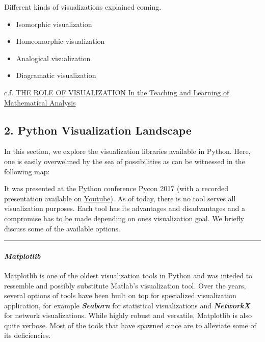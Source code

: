 \documentclass[11pt]{article}
\providecommand{\tightlist}{%
      \setlength{\itemsep}{0pt}\setlength{\parskip}{0pt}}
\begin{document}
    Different kinds of visualizations explained coming.

\begin{itemize}
\tightlist
\item
  Isomorphic visualization
\item
  Homeomorphic visualization
\item
  Analogical visualization
\item
  Diagramatic visualization
\end{itemize}

c.f. \href{http://users.math.uoc.gr/~ictm2/Proceedings/invGuz.pdf}{THE
ROLE OF VISUALIZATION In the Teaching and Learning of Mathematical
Analysis}

    \subsection{2. Python Visualization Landscape
}\label{python-visualization-landscape}

In this section, we explore the visualization libraries available in
Python. Here, one is easily overwelmed by the sea of possibilities as
can be witnessed in the following map:

    

    It was presented at the Python conference Pycon 2017 (with a recorded
presentation available on
\href{https://www.youtube.com/watch?v=TPl9bMg8j8U}{Youtube}). As of
today, there is no tool serves all visualization purposes. Each tool has
its advantages and disadvantages and a compromise has to be made
depending on ones visualization goal. We briefly discuss some of the
available options.

\begin{center}\rule{0.5\linewidth}{\linethickness}\end{center}

\paragraph{\texorpdfstring{\emph{Matplotlib}}{Matplotlib}}\label{matplotlib}

Matplotlib is one of the oldest visualization tools in Python and was
inteded to ressemble and possibly substitute Matlab's visualization
tool. Over the years, several options of tools have been built on top
for specialized visualization application, for example
\textbf{\emph{Seaborn}} for statistical visualizations and
\textbf{\emph{NetworkX}} for network visualizations. While highly robust
and versatile, Matplotlib is also quite verbose. Most of the tools that
have spawned since are to alleviate some of its deficiencies.
\end{document}
